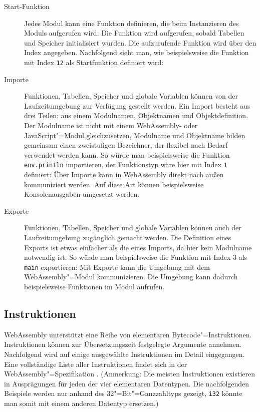 \begin{description}
    \item[Start-Funktion] Jedes Modul kann eine Funktion definieren, die beim Instanzieren des Moduls aufgerufen wird. Die Funktion wird aufgerufen, sobald Tabellen und Speicher initialisiert wurden. Die aufzurufende Funktion wird über den Index angegeben. Nachfolgend sieht man, wie beispielsweise die Funktion mit Index \lstinline{12} als Startfunktion definiert wird: 
    \item[Importe] Funktionen, Tabellen, Speicher und globale Variablen können von der Laufzeitumgebung zur Verfügung gestellt werden. Ein Import besteht aus drei Teilen: aus einem Modulnamen, Objektnamen und Objektdefinition. Der Modulname ist nicht mit einem WebAssembly- oder JavaScript"=Modul gleichzusetzen, Modulname und Objektname bilden gemeinsam einen zweistufigen Bezeichner, der flexibel nach Bedarf verwendet werden kann. So würde man beispielsweise die Funktion \lstinline{env.println} importieren, der Funktionstyp wäre hier mit Index \lstinline{1} definiert: 
    Über Importe kann in WebAssembly direkt nach außen kommuniziert werden. Auf diese Art können beispielsweise Konsolenausgaben umgesetzt werden.
    \item[Exporte] Funktionen, Tabellen, Speicher und globale Variablen können auch der Laufzeitumgebung zugänglich gemacht werden. Die Definition eines Exports ist etwas einfacher als die eines Imports, da hier kein Modulname notwendig ist. So würde man beispielsweise die Funktion mit Index 3 als \lstinline{main} exportieren: 
    Mit Exporte kann die Umgebung mit dem WebAssembly"=Modul kommunizieren. Die Umgebung kann dadurch beispielsweise Funktionen im Modul aufrufen.
\end{description}

\subsection{Instruktionen}
\label{subsec:WebAssembly-Instruktionen}
WebAssembly unterstützt eine Reihe von elementaren Bytecode"=Instruktionen. Instruktionen können zur Übersetzungszeit festgelegte Argumente annehmen. Nachfolgend wird auf einige ausgewählte Instruktionen im Detail eingegangen. Eine vollständige Liste aller Instruktionen findet sich in der WebAssembly"=Spezifikation \cite{WebAssemblySpecification}. (Anmerkung: Die meisten Instruktionen existieren in Ausprägungen für jeden der vier elementaren Datentypen. Die nachfolgenden Beispiele werden nur anhand des 32"=Bit"=Ganzzahltyps gezeigt, \lstinline{i32} könnte man somit mit einem anderen Datentyp ersetzen.)

